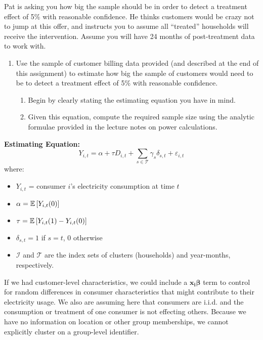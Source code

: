 \documentclass[12pt]{article}
\begin{document}
{Pat is asking you how big the sample should be in order to detect a treatment effect of 5\% with reasonable
confidence. He thinks customers would be crazy not to jump at this offer, and instructs you to assume all
``treated'' households will receive the intervention. Assume you will have 24 months of post-treatment
data to work with.\\
    \begin{enumerate}[label=(\arabic*)]
        \item Use the sample of customer billing data provided (and described at the end of this assignment) to estimate how big the sample of customers would need to be to detect a treatment effect of 5\% with reasonable confidence.
        \begin{enumerate}[label=\alph*]
            \item Begin by clearly stating the estimating equation you have in mind.
            \item Given this equation, compute the required sample size using the analytic formulae provided in the lecture notes on power calculations.
        \end{enumerate}
    \end{enumerate} 
}

\def\II{\mathcal{I}}
\def\TT{\mathcal{T}}
\def\one{\mathbbm{1}}

\textbf{Estimating Equation:}
\begin{equation}
    Y_{i,t} = \alpha + \tau D_{i,t}
        + \sum\limits_{s\in\TT}\gamma_s\delta_{s,t} + \varepsilon_{i,t}
    \label{1.1a}
\end{equation}
where:
\begin{itemize}
    \item $Y_{i,t}$ = consumer $i$'s electricity consumption at time $t$
    \item $\alpha = \mathbb{E}\left[Y_{i,t}(0)\right]$ 
    \item $\tau = \mathbb{E}\left[Y_{i,t}(1) - Y_{i,t}(0)\right]$
    \item $\delta_{s,t} = 1$ if $s=t$, 0 otherwise
    \item $\II$ and $\TT$ are the index sets of clusters (households) and year-months, respectively.
\end{itemize}

If we had customer-level characteristics, we could include a $\boldsymbol{x_i}\boldsymbol{\beta}$ term to control for random differences in consumer characteristics that might contribute to their electricity usage. We also are assuming here that consumers are i.i.d. and the consumption or treatment of one consumer is not effecting others. Because we have no information on location or other group memberships, we cannot explicitly cluster on a group-level identifier.
\end{document}
